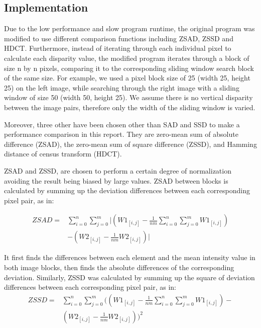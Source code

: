 \documentclass[conference]{IEEEtran}
\begin{document}
\subsection{Implementation}
Due to the low performance and slow program runtime, the original program was modified to use different comparison functions including ZSAD, ZSSD and HDCT. Furthermore, instead of iterating through each individual pixel to calculate each disparity value, the modified program iterates through a block of size n by n pixels, comparing it to the corresponding sliding window search block of the same size. For example, we used a pixel block size of 25 (width 25, height 25) on the left image, while searching through the right image with a sliding window of size 50 (width 50, height 25). We assume there is no vertical disparity between the image pairs, therefore only the width of the sliding window is varied.

Moreover, three other have been chosen other than SAD and SSD to make a performance comparison in this report. They are zero-mean sum of absolute difference (ZSAD), the zero-mean sum of square difference (ZSSD), and Hamming distance of census transform (HDCT). 

ZSAD and ZSSD, are chosen to perform a certain degree of normalization avoiding the result being biased by large values. ZSAD between blocks is calculated by summing up the deviation differences between each corresponding pixel pair, as in:

\begin{equation*}
    \begin{aligned}
        ZSAD= {} & \sum^{n}_{i=0}\sum^{m}_{j=0}|(W1_{[i,j]}-\frac{1}{nm}\sum^{n}_{i=0}\sum^{m}_{j=0}W1_{[i,j]})\\
        & -(W2_{[i,j]}-\frac{1}{nm}W2_{[i,j]})|
    \end{aligned}
\end{equation*}

It first finds the differences between each element and the mean intensity value in both image blocks, then finds the absolute differences of the corresponding deviation. Similarly, ZSSD was calculated by summing up the square of deviation differences between each corresponding pixel pair, as in:
\begin{equation*}
    \begin{aligned}
        ZSSD= {} & \sum^{n}_{i=0}\sum^{m}_{j=0}((W1_{[i,j]}-\frac{1}{nm}\sum^{n}_{i=0}\sum^{m}_{j=0}W1_{[i,j]})- \\
        & (W2_{[i,j]}-\frac{1}{nm}W2_{[i,j]}))^2
    \end{aligned}
\end{equation*}
\end{document}
